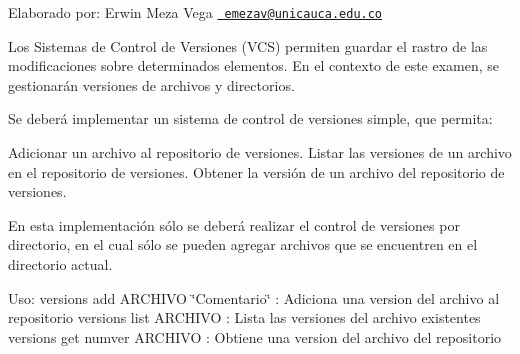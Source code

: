 Elaborado por\+: Erwin Meza Vega \href{mailto:emezav@unicauca.edu.co}{\texttt{ emezav@unicauca.\+edu.\+co}}

Los Sistemas de Control de Versiones (VCS) permiten guardar el rastro de las modificaciones sobre determinados elementos. En el contexto de este examen, se gestionarán versiones de archivos y directorios.

Se deberá implementar un sistema de control de versiones simple, que permita\+:

Adicionar un archivo al repositorio de versiones. Listar las versiones de un archivo en el repositorio de versiones. Obtener la versión de un archivo del repositorio de versiones.

En esta implementación sólo se deberá realizar el control de versiones por directorio, en el cual sólo se pueden agregar archivos que se encuentren en el directorio actual.

Uso\+: versions add ARCHIVO \char`\"{}\+Comentario\char`\"{} \+: Adiciona una version del archivo al repositorio versions list ARCHIVO \+: Lista las versiones del archivo existentes versions get numver ARCHIVO \+: Obtiene una version del archivo del repositorio 